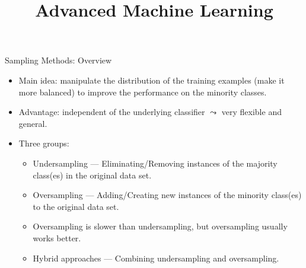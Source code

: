 \documentclass[11pt,compress,t,notes=noshow, xcolor=table]{beamer}
\title{Advanced Machine Learning}
\date{}
\begin{document}
	
	
	
	
	\sloppy
	
	
	
	\begin{frame}{Sampling Methods: Overview}
		\footnotesize
		\begin{itemize}

			\item Main idea: manipulate the distribution of the training examples (make it more balanced) to improve the performance on the minority classes.
			
			\item Advantage: independent of the underlying classifier $\leadsto$ very flexible and general.
   
			\item Three groups: 
            \vspace{10pt}
		
			\begin{minipage}{0.5\textwidth}
		
				\begin{itemize} 
                    \footnotesize
                    
					\item Undersampling --- Eliminating/Removing instances of the majority class(es) in the original data set.
                    \vspace{10pt}
			
					\item Oversampling --- Adding/Creating new instances of the minority class(es) to the original data set.
                    \vspace{10pt}

                    \item Oversampling is slower than undersampling, but oversampling usually works better.
                    \vspace{10pt}

					\item Hybrid approaches --- Combining undersampling and oversampling.
                    \vspace{10pt}
			
				\end{itemize}
		
			\end{minipage}
			\begin{minipage}{0.4\textwidth}
					\begin{figure}
					\centering
				\end{figure}
			\end{minipage}
	
		\end{itemize}
		
	\end{frame}
\end{document}
